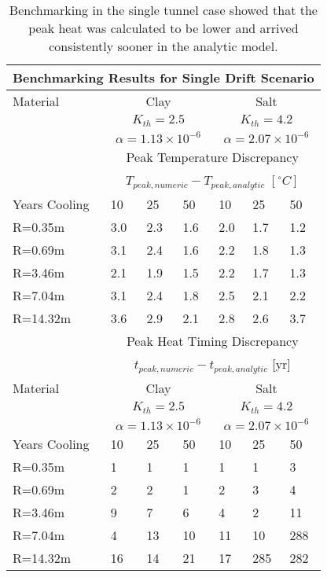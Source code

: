 \begin{table}
  \centering
  \begin{tabular}{|l|l|l|l|l|l|l|}
    \multicolumn{7}{c}{\textbf{Benchmarking Results for Single Drift 
    Scenario}}\\
    \hline
    Material & \multicolumn{3}{|c|}{Clay} & \multicolumn{3}{|c|}{Salt}\\ & 
    \multicolumn{3}{|c|}{$K_{th}=2.5$} & \multicolumn{3}{|c|}{$K_{th}=4.2$}\\ & 
    \multicolumn{3}{|c|}{$\alpha=1.13\times10^{-6}$} & 
    \multicolumn{3}{|c|}{$\alpha=2.07\times10^{-6}$}\\ 
    \hline
    & \multicolumn{6}{|c|}{Peak Temperature Discrepancy}\\ 
    & \multicolumn{6}{|c|}{$T_{peak,numeric}-T_{peak,analytic}$ $[^{\circ}C]$} \\
    \hline
    Years Cooling  & 10     & 25      & 50      & 10     & 25     & 50\\
    \hline
     R=0.35m  & 3.0   & 2.3     & 1.6    & 2.0   & 1.7   & 1.2\\
     R=0.69m  & 3.1   & 2.4    & 1.6    & 2.2    & 1.8   & 1.3\\
     R=3.46m  & 2.1   & 1.9    & 1.5    & 2.2   & 1.7    & 1.3\\
     R=7.04m  & 3.1   & 2.4     & 1.8    & 2.5   & 2.1   & 2.2\\
     R=14.32m & 3.6   & 2.9    & 2.1    & 2.8   & 2.6   & 3.7\\
    \hline
    & \multicolumn{6}{|c|}{Peak Heat Timing Discrepancy}\\ 
    & \multicolumn{6}{|c|}{ $t_{peak,numeric}-t_{peak,analytic}$ [yr]} \\
    \hline
    Material & \multicolumn{3}{|c|}{Clay} & \multicolumn{3}{|c|}{Salt}\\ & 
    \multicolumn{3}{|c|}{$K_{th}=2.5$} & \multicolumn{3}{|c|}{$K_{th}=4.2$}\\ & 
    \multicolumn{3}{|c|}{$\alpha=1.13\times10^{-6}$} & 
    \multicolumn{3}{|c|}{$\alpha=2.07\times10^{-6}$}\\ \hline
    Years Cooling  & 10     & 25      & 50      & 10     & 25     & 50\\
    \hline
     R=0.35m  & 1    & 1       & 1   & 1      & 1      & 3\\
     R=0.69m  & 2    & 2       & 1    & 2      & 3      & 4\\
     R=3.46m  & 9    & 7       & 6    & 4      & 2      & 11\\
     R=7.04m  & 4    & 13      & 10    & 11     & 10     & 288\\
     R=14.32m & 16   & 14      & 21   & 17     & 285    & 282\\
    \hline
  \end{tabular}
  \caption{Benchmarking in the single tunnel case showed that the peak heat was 
  calculated to be lower and arrived consistently sooner in the analytic model. 
  }
  \label{tab:benchSingle}
\end{table}

